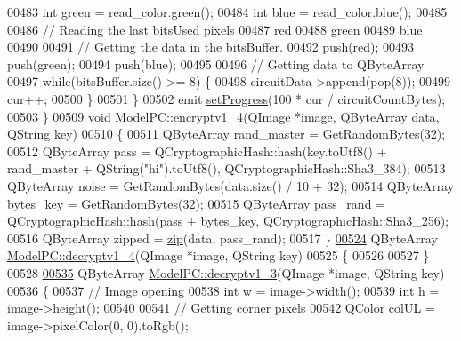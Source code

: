 \begin{DoxyCode}
00483         \textcolor{keywordtype}{int} green = read\_color.green();
00484         \textcolor{keywordtype}{int} blue = read\_color.blue();
00485 
00486         \textcolor{comment}{// Reading the last bitsUsed pixels}
00487         red %
00488         green %
00489         blue %
00490 
00491         \textcolor{comment}{// Getting the data in the bitsBuffer.}
00492         push(red);
00493         push(green);
00494         push(blue);
00495 
00496         \textcolor{comment}{// Getting data to QByteArray}
00497         \textcolor{keywordflow}{while}(bitsBuffer.size() >= 8) \{
00498             circuitData->append(pop(8));
00499             cur++;
00500         \}
00501     \}
00502     emit \hyperlink{class_model_p_c_afdcd80f0ed5062e145a71f09b0897547}{setProgress}(100 * cur / circuitCountBytes);
00503 \}
\hypertarget{modelpc_8cpp_source_l00509}{}\hyperlink{class_model_p_c_a4daefc3fb87a1f19172b9b20c987eb12}{00509} \textcolor{keywordtype}{void} \hyperlink{class_model_p_c_a4daefc3fb87a1f19172b9b20c987eb12}{ModelPC::encryptv1\_4}(QImage *image, QByteArray \hyperlink{namespace_errors_dict_setup_adf4c30d205d29df7343e26f7c62b0685}{data}, QString key)
00510 \{
00511     QByteArray rand\_master = GetRandomBytes(32);
00512     QByteArray pass = QCryptographicHash::hash(key.toUtf8() + rand\_master + QString(\textcolor{stringliteral}{"hi"}).toUtf8(), 
      QCryptographicHash::Sha3\_384);
00513     QByteArray noise = GetRandomBytes(data.size() / 10 + 32);
00514     QByteArray bytes\_key = GetRandomBytes(32);
00515     QByteArray pass\_rand = QCryptographicHash::hash(pass + bytes\_key, QCryptographicHash::Sha3\_256);
00516     QByteArray zipped = \hyperlink{class_model_p_c_afebbbfa4b07deba4f68fc6dfb50f353f}{zip}(data, pass\_rand);
00517 \}
\hypertarget{modelpc_8cpp_source_l00524}{}\hyperlink{class_model_p_c_a7a1f7d491e1bde16936190b9e90896b0}{00524} QByteArray \hyperlink{class_model_p_c_a7a1f7d491e1bde16936190b9e90896b0}{ModelPC::decryptv1\_4}(QImage *image, QString key)
00525 \{
00526 
00527 \}
00528 
\hypertarget{modelpc_8cpp_source_l00535}{}\hyperlink{class_model_p_c_a4fe70ebbedfaf31d45a35f82d0f06caa}{00535} QByteArray \hyperlink{class_model_p_c_a4fe70ebbedfaf31d45a35f82d0f06caa}{ModelPC::decryptv1\_3}(QImage *image, QString key)
00536 \{
00537     \textcolor{comment}{// Image opening}
00538     \textcolor{keywordtype}{int} w = image->width();
00539     \textcolor{keywordtype}{int} h = image->height();
00540 
00541     \textcolor{comment}{// Getting corner pixels}
00542     QColor colUL = image->pixelColor(0, 0).toRgb();

\end{DoxyCode}
